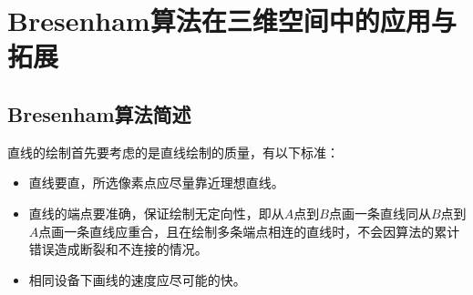 \section{Bresenham算法在三维空间中的应用与拓展}
\subsection{Bresenham算法简述\cite{计算机图形学基础}}
直线的绘制首先要考虑的是直线绘制的质量，有以下标准：
\begin{itemize}
    \item 直线要直，所选像素点应尽量靠近理想直线。
    \item 直线的端点要准确，保证绘制无定向性，即从$A$点到$B$点画一条直线同从$B$点到$A$点画一条直线应重合，且在绘制多条端点相连的直线时，不会因算法的累计错误造成断裂和不连接的情况。
    \item 相同设备下画线的速度应尽可能的快。
\end{itemize}
